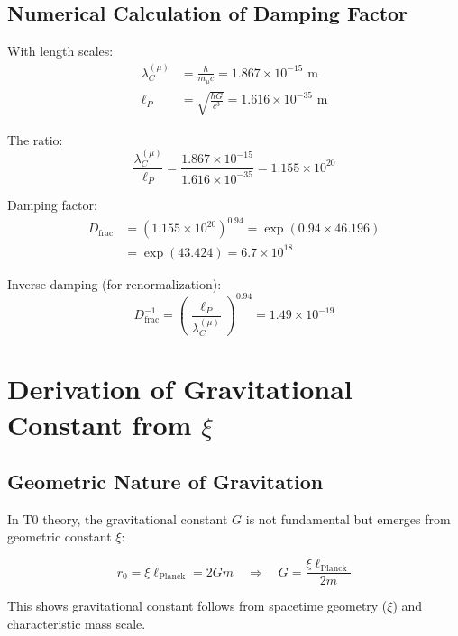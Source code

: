 \documentclass[12pt,a4paper]{article}
\theoremstyle{definition}
\begin{document}
	\subsection{Numerical Calculation of Damping Factor}
	
	With length scales:
	\begin{align}
		\lambda_C^{(\mu)} &= \frac{\hbar}{m_\mu c} = 1.867 \times 10^{-15} \text{ m}\\
		\ell_P &= \sqrt{\frac{\hbar G}{c^3}} = 1.616 \times 10^{-35} \text{ m}
	\end{align}
	
	The ratio:
	\begin{equation}
		\frac{\lambda_C^{(\mu)}}{\ell_P} = \frac{1.867 \times 10^{-15}}{1.616 \times 10^{-35}} = 1.155 \times 10^{20}
	\end{equation}
	
	Damping factor:
	\begin{align}
		D_{\text{frac}} &= \left(1.155 \times 10^{20}\right)^{0.94} = \exp(0.94 \times 46.196)\\
		&= \exp(43.424) = 6.7 \times 10^{18}
	\end{align}
	
	Inverse damping (for renormalization):
	\begin{equation}
		D_{\text{frac}}^{-1} = \left(\frac{\ell_P}{\lambda_C^{(\mu)}}\right)^{0.94} = 1.49 \times 10^{-19}
	\end{equation}
	
	\section{Derivation of Gravitational Constant from $\xi$}
	
	\subsection{Geometric Nature of Gravitation}
	
	In T0 theory, the gravitational constant $G$ is not fundamental but emerges from geometric constant $\xi$:
	
	\begin{equation}
		r_0 = \xi \ell_{\mathrm{Planck}} = 2Gm
		\quad \Rightarrow \quad 
		G = \frac{\xi \ell_{\mathrm{Planck}}}{2m}
	\end{equation}
	
	This shows gravitational constant follows from spacetime geometry ($\xi$) and characteristic mass scale.
	
\end{document}
